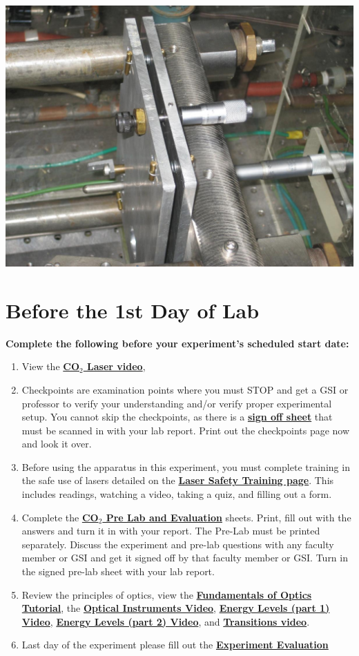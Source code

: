 \documentclass{../lab}
\begin{document}
\href{http://experimentationlab.berkeley.edu/sites/default/files/CO-2/Co-2-Grating_3641_0.JPG}{\includegraphics[width=0.33\linewidth,keepaspectratio]{images/Co-2-Grating_3641_0.JPG}}

\section{Before the 1st Day of Lab}

\textbf{Complete the following before your experiment's scheduled start date:}

\begin{enumerate}
    \item View the \href{http://youtu.be/-cLSnuXGC\_U}{\textbf{CO$_2$ Laser video}},

    \item Checkpoints are examination points where you must STOP and get a GSI or professor to verify your understanding and/or verify proper experimental setup. You cannot skip the checkpoints, as there is a \href{http://experimentationlab.berkeley.edu/node/137}{\textbf{sign off sheet}} that must be scanned in with your lab report. Print out the checkpoints page now and look it over.

    \item Before using the apparatus in this experiment, you must complete training in the safe use of lasers detailed on the \href{http://experimentationlab.berkeley.edu/lasersafety}{\textbf{\textbf{Laser Safety Training page}}}. This includes readings, watching a video, taking a quiz, and filling out a form.

    \item Complete the \href{http://experimentationlab.berkeley.edu/CO2prelab}{\textbf{\textbf{CO$_2$ Pre Lab and Evaluation}}} sheets. Print,  fill out with the answers and turn it in with your report. The Pre-Lab must be printed separately. Discuss the experiment and pre-lab questions with any faculty member or GSI and get it signed off by that faculty member or GSI. Turn in the signed pre-lab sheet with your lab report.

    \item Review the principles of optics, view the \href{http://experimentationlab.berkeley.edu/sites/default/files/QIE/fundamental-Optics.pdf}{\textbf{Fundamentals of Optics Tutorial}}, the \href{http://youtu.be/zUGBt5vc5FA}{\textbf{Optical Instruments Video}}, \href{http://youtu.be/wyBOVjU5bBQ}{\textbf{Energy Levels (part 1) Video}}, \href{http://youtu.be/Eypw0DmVBxk}{\textbf{Energy Levels (part 2) Video}}, and \href{http://youtu.be/xOMgdVP3AfE}{\textbf{Transitions video}}.

    \item Last day of the experiment please fill out the \href{\ExperimentEvaluation}{\textbf{Experiment Evaluation}}

\end{enumerate}
\end{document}

